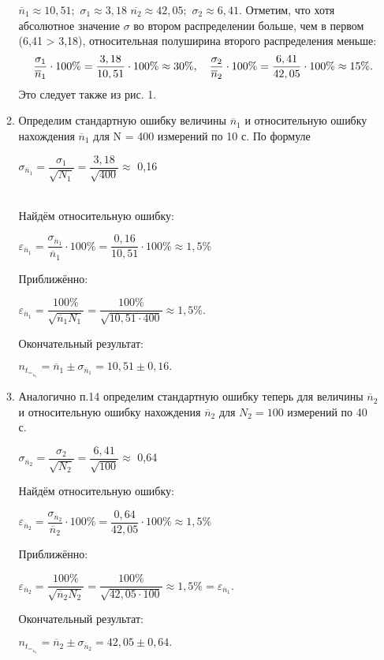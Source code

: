 \documentclass[a4paper, 10pt]{article}
\begin{document}
\begin{enumerate}
\begin{enumerate}
$\overline{n}_1
\approx 10,51 ; $
\hspace{2 mm} $\sigma_1 \approx 3,18$ 
$\overline{n_2} \approx 42,05;$ \hspace {2 mm} $\sigma_2 \approx 6,41.$   Отметим, что хотя абсолютное значение $\sigma$ во втором распределении больше, чем в первом (6,41 > 3,18), относительная полуширина второго распределения меньше: \\ \hspace{6 mm} 
\[ \hspace {3 mm} \dfrac{\sigma_1}{\overline{n}_1}  \cdot	 100\%  = \dfrac{3,18}{10,51} \cdot 100\% \approx 30\% , \quad\dfrac{\sigma_2}{\overline{n}_2}  \cdot	 100\%  = \dfrac{6,41}{42,05} \cdot 100\% \approx 15\% \text{.} \] \hspace{-1 mm} Это следует также из рис. 1.

\item  Определим стандартную ошибку величины $\overline{n}_1$ и относительную ошибку нахождения $\overline{n}_1$ для N = 400 измерений по 10 с. По формуле \begin {center} $\sigma_{\overline{n}_1} = \dfrac{\sigma_1}{\sqrt{N_1}} = \dfrac{3,18}{\sqrt{400}}   \approx$ 0,16    \end{center}  \\ 
Найдём относительную ошибку:
\begin{center} $\varepsilon_{\overline{n}_1} = \dfrac{\sigma_{\overline{n}_1}}{\overline{n}_1} \cdot 100\% = \dfrac{0,16}{10,51} \cdot 100\% \approx 1,5\%$ \end{center}
Приближённо: 
\begin{center} $\varepsilon_{\overline{n}_1} = \dfrac{100\%}{\sqrt{{\overline{n}_1} N_1}}  = \dfrac{100\%}{\sqrt{10,51 \cdot 400}} \approx 1,5\%.$ \end{center} 
Окончательный результат: \begin{center}
$n_t_=_1_0_c = \overline{n}_1 \pm \sigma_{\overline{n}_1} = 10,51 \pm 0,16.  $   \end{center}
\item Аналогично п.14 определим стандартную ошибку теперь для величины $\overline{n}_2$ и относительную ошибку нахождения $\overline{n}_2$ для $N_2 = 100$ измерений по 40 с.
\begin {center} $\sigma_{\overline{n}_2} = \dfrac{\sigma_2}{\sqrt{N_2}} = \dfrac{6,41}{\sqrt{100}}   \approx$ 0,64    \end{center}
Найдём относительную ошибку:
\begin{center} $\varepsilon_{\overline{n}_2} = \dfrac{\sigma_{\overline{n}_2}}{\overline{n}_2} \cdot 100\% = \dfrac{0,64}{42,05} \cdot 100\% \approx 1,5\%$ \end{center}
Приближённо: 
\begin{center} $\varepsilon_{\overline{n}_2} = \dfrac{100\%}{\sqrt{{\overline{n}_2} N_2}}  = \dfrac{100\%}{\sqrt{42,05 \cdot 100}} \approx 1,5\% = \varepsilon_{\overline{n}_1}.$ \end{center} 
Окончательный результат: \begin{center}
$n_t_=_1_0_c = \overline{n}_2 \pm \sigma_{\overline{n}_2} = 42,05 \pm 0,64.  $   \end{center}
\end{enumerate}

\end{enumerate}
\end{document}

